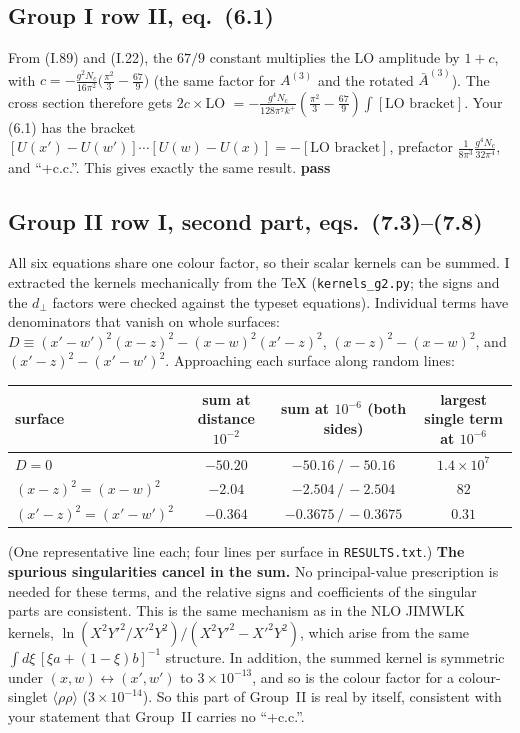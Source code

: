 \documentclass[10pt]{article}
\newcommand{\ok}{\textcolor{green!45!black}{\textbf{pass}}}
\begin{document}
\subsection{Group I row II, eq.~(6.1)}\label{sec:61}
From (I.89) and (I.22), the $67/9$ constant multiplies the LO amplitude by $1+c$, with
$c=-\frac{g^2N_c}{16\pi^2}\big(\frac{\pi^2}{3}-\frac{67}{9}\big)$ (the same factor for $A^{(3)}$ and the rotated $\bar A^{(3)}$). The cross section therefore gets
$2c\times$LO $=-\frac{g^4N_c}{128\pi^7k^+}(\frac{\pi^2}{3}-\frac{67}{9})\int[\text{LO bracket}]$. Your (6.1) has the bracket
$[U(x')-U(w')]\cdots[U(w)-U(x)]=-[\text{LO bracket}]$, prefactor $\frac{1}{8\pi^3}\frac{g^4N_c}{32\pi^4}$, and ``+c.c.''. This gives exactly the same result. \ok

\subsection{Group II row I, second part, eqs.~(7.3)--(7.8)}\label{sec:g2}
All six equations share one colour factor, so their scalar kernels can be summed. I extracted the kernels mechanically from the TeX
(\texttt{kernels\_g2.py}; the signs and the $d_\perp$ factors were checked against the typeset equations). Individual terms have denominators
that vanish on whole surfaces: $D\equiv(x'-w')^2(x-z)^2-(x-w)^2(x'-z)^2$, $(x-z)^2-(x-w)^2$, and $(x'-z)^2-(x'-w')^2$. Approaching each surface along random lines:
\begin{center}
\begin{tabular}{lccc}
\toprule
surface & sum at distance $10^{-2}$ & sum at $10^{-6}$ (both sides) & largest single term at $10^{-6}$\\
\midrule
$D=0$ & $-50.20$ & $-50.16\,/\,-50.16$ & $1.4\times10^{7}$\\
$(x-z)^2=(x-w)^2$ & $-2.04$ & $-2.504\,/\,-2.504$ & $82$\\
$(x'-z)^2=(x'-w')^2$ & $-0.364$ & $-0.3675\,/\,-0.3675$ & $0.31$\\
\bottomrule
\end{tabular}
\end{center}
(One representative line each; four lines per surface in \texttt{RESULTS.txt}.) \textbf{The spurious singularities cancel in the sum.}
No principal-value prescription is needed for these terms, and the relative signs and coefficients of the singular parts are consistent. This is
the same mechanism as in the NLO JIMWLK kernels, $\ln(X^2Y'^2/X'^2Y^2)/(X^2Y'^2-X'^2Y^2)$, which arise from the same
$\int d\xi\,[\xi a+(1-\xi)b]^{-1}$ structure. In addition, the summed kernel is symmetric under $(x,w)\leftrightarrow(x',w')$ to $3\times10^{-13}$, and
so is the colour factor for a colour-singlet $\langle\rho\rho\rangle$ ($3\times10^{-14}$). So this part of Group~II is real by itself, consistent with your
statement that Group~II carries no ``+c.c.''.
\end{document}
